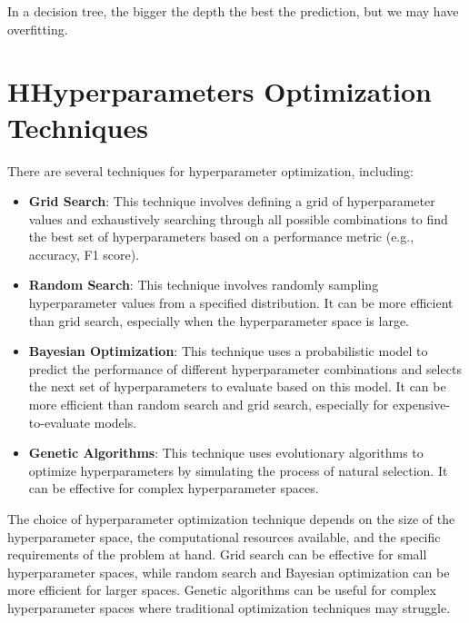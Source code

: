 \documentclass[conference]{IEEEtran}
\begin{document}
In a decision tree, the bigger the depth the best the prediction, but we may have overfitting.

\section*{HHyperparameters Optimization Techniques}
There are several techniques for hyperparameter optimization, including:
\begin{itemize}
    \item \textbf{Grid Search}: This technique involves defining a grid of hyperparameter values and exhaustively searching through all possible combinations to find the best set of hyperparameters based on a performance metric (e.g., accuracy, F1 score).
    \item \textbf{Random Search}: This technique involves randomly sampling hyperparameter values from a specified distribution. It can be more efficient than grid search, especially when the hyperparameter space is large.
    \item \textbf{Bayesian Optimization}: This technique uses a probabilistic model to predict the performance of different hyperparameter combinations and selects the next set of hyperparameters to evaluate based on this model. It can be more efficient than random search and grid search, especially for expensive-to-evaluate models.
    \item \textbf{Genetic Algorithms}: This technique uses evolutionary algorithms to optimize hyperparameters by simulating the process of natural selection. It can be effective for complex hyperparameter spaces.
\end{itemize}
The choice of hyperparameter optimization technique depends on the size of the hyperparameter space, the computational
resources available, and the specific requirements of the problem at hand. Grid search can be effective for small hyperparameter spaces, while random search and Bayesian optimization can be more efficient for larger spaces. Genetic algorithms can be useful for complex hyperparameter spaces where traditional optimization techniques may struggle.
\end{document}
